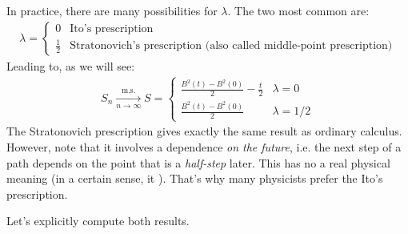 \documentclass[../template.tex]{subfiles}
\begin{document}
\begin{example}
    In practice, there are many possibilities for $\lambda$. The two most common are:
    \begin{align*}
        \lambda = \begin{cases}
            0 & \text{Ito's prescription}\\
            \frac{1}{2} & \text{Stratonovich's prescription (also called middle-point prescription)} 
        \end{cases}
    \end{align*} 
    Leading to, as we will see:
    \begin{align*}
        S_n  \xrightarrow[n \to \infty]{\mathrm{m.s.}} S = \begin{cases}
            \frac{B^2(t) - B^2(0)}{2} -\frac{t}{2} & \lambda = 0  \\
            \frac{B^2(t) - B^2(0)}{2} & \lambda=1/2            
        \end{cases}  
    \end{align*} 
    The Stratonovich prescription gives exactly the same result as ordinary calculus. However, note that it involves a dependence \textit{on the future}, i.e. the next step of a path depends on the point that is a \textit{half-step} later. This has no a real physical meaning (in a certain sense, it ). That's why many physicists prefer the Ito's prescription.

    Let's explicitly compute both results.
    
    \medskip


\end{example}
\end{document}
